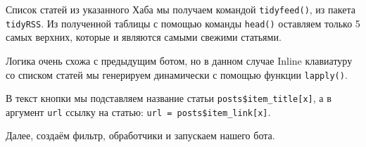 \documentclass[
]{book}
\newenvironment{Shaded}{\begin{snugshade}}{\end{snugshade}}
\newcommand{\AttributeTok}[1]{\textcolor[rgb]{0.13,0.29,0.53}{#1}}
\newcommand{\CommentTok}[1]{\textcolor[rgb]{0.56,0.35,0.01}{\textit{#1}}}
\newcommand{\ControlFlowTok}[1]{\textcolor[rgb]{0.13,0.29,0.53}{\textbf{#1}}}
\newcommand{\DecValTok}[1]{\textcolor[rgb]{0.00,0.00,0.81}{#1}}
\newcommand{\FunctionTok}[1]{\textcolor[rgb]{0.13,0.29,0.53}{\textbf{#1}}}
\newcommand{\NormalTok}[1]{#1}
\newcommand{\OtherTok}[1]{\textcolor[rgb]{0.56,0.35,0.01}{#1}}
\newcommand{\SpecialCharTok}[1]{\textcolor[rgb]{0.81,0.36,0.00}{\textbf{#1}}}
\newcommand{\StringTok}[1]{\textcolor[rgb]{0.31,0.60,0.02}{#1}}
\begin{document}
Список статей из указанного Хаба мы получаем командой \texttt{tidyfeed()}, из пакета \texttt{tidyRSS}. Из полученной таблицы с помощью команды \texttt{head()} оставляем только 5 самых верхних, которые и являются самыми свежими статьями.

\begin{Shaded}
\end{Shaded}

Логика очень схожа с предыдущим ботом, но в данном случае Inline клавиатуру со списком статей мы генерируем динамически с помощью функции \texttt{lapply()}.

\begin{Shaded}
\end{Shaded}

В текст кнопки мы подставляем название статьи \texttt{posts\$item\_title{[}x{]}}, а в аргумент \texttt{url} ссылку на статью: \texttt{url\ =\ posts\$item\_link{[}x{]}}.

Далее, создаём фильтр, обработчики и запускаем нашего бота.
\end{document}
